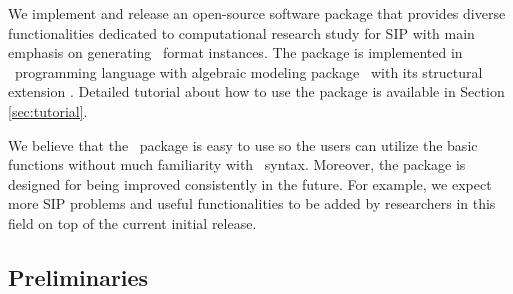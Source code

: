 We implement and release an open-source software package that provides diverse functionalities dedicated to computational research study for SIP with main emphasis on generating \smps\ format instances. The package is implemented in \julia\ programming language with algebraic modeling package \jump\ with its structural extension \structjump. Detailed tutorial about how to use the package is available in Section \ref{sec:tutorial}. 

We believe that the \siplibtwo\ package is easy to use so the users can utilize the basic functions without much familiarity with \julia\ syntax. Moreover, the package is designed for being improved consistently in the future. For example, we expect more SIP problems and useful functionalities to be added by researchers in this field on top of the current initial release.
\subsection{Preliminaries}

